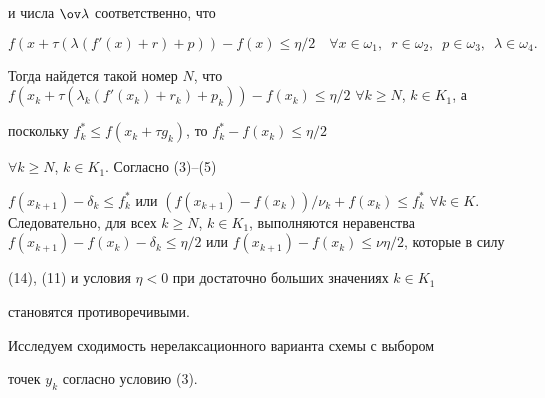 \begin{pf}
и числа $\ov \lambda$ соответственно, что


$$


f(x+\tau (\lambda ({f}'(x)+r)+p))-f(x)\le \eta /2


\quad \forall x\in \omega_1,\ \;


r\in \omega_2,\ \; p\in \omega_3,\ \; \lambda \in \omega_4.


$$


Тогда найдется такой номер $N$, что $f(x_k+\tau (\lambda_k ({f}'(x_k)+r_k)


+p_k))-f(x_k)\le \eta /2$ $\forall k\ge N$, $k\in K_1$, а


поскольку $f^*_k\le f(x_k+\tau g_k)$, то $f^*_k-f(x_k)\le \eta /2$


$\forall k\ge N$, $k\in K_1$. Согласно (3)--(5)


$f(x_{k+1})-\delta_k\le f^*_k$ или $(f(x_{k+1})-f(x_k))/\nu_k+f(x_k)


\le f^*_k$ $\forall k\in K$. Следовательно, для всех $k\ge


N$, $k\in K_1$, выполняются неравенства $f(x_{k+1})-f(x_k)-\delta_k


\le \eta /2$ или $f(x_{k+1})-f(x_k)\le \nu \eta /2$, которые в силу


(14), (11) и условия $\eta<0$ при достаточно больших значениях $k\in K_1$


становятся противоречивыми.


\end{pf}





Исследуем сходимость нерелаксационного варианта схемы с выбором 


точек $y_k$ согласно условию (3).





